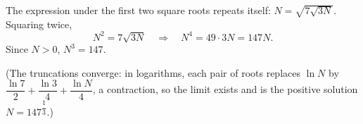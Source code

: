 The expression under the first two square roots repeats itself: $N=\sqrt{7\sqrt{3N}}$. Squaring twice,
\[
N^2=7\sqrt{3N}\quad\Longrightarrow\quad N^4=49\cdot3N=147N .
\]
Since $N>0$, $N^3=\boxed{147}$.

(The truncations converge: in logarithms, each pair of roots replaces $\ln N$ by $\dfrac{\ln7}{2}+\dfrac{\ln3}{4}+\dfrac{\ln N}{4}$, a contraction, so the limit exists and is the positive solution $N=147^{\dfrac{1}{3}}$.)
